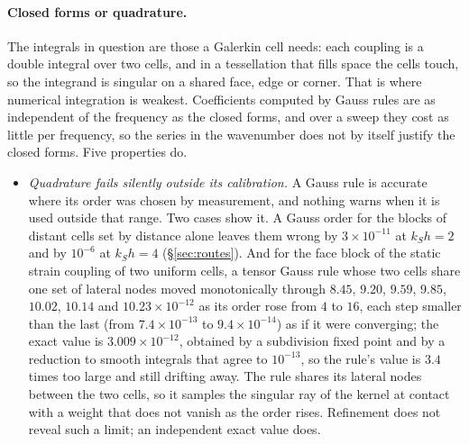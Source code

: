 \documentclass[11pt,a4paper]{article}
\begin{document}
\paragraph{Closed forms or quadrature.} The integrals in question are those a Galerkin cell needs: each coupling
is a double integral over two cells, and in a tessellation that fills space the cells touch, so the integrand
is singular on a shared face, edge or corner. That is where numerical integration is weakest. Coefficients
computed by Gauss rules are as independent of the frequency as the closed forms, and over a sweep they cost as
little per frequency, so the series in the wavenumber does not by itself justify the closed forms. Five
properties do.
\begin{itemize}
\item \emph{Quadrature fails silently outside its calibration.} A Gauss rule is accurate where its order was
chosen by measurement, and nothing warns when it is used outside that range. Two cases show it. A Gauss
order for the blocks of distant cells set by distance alone leaves them wrong by $3\times10^{-11}$ at
$k_Sh=2$ and by $10^{-6}$ at $k_Sh=4$ (\S\ref{sec:routes}). And for the face block of the static strain coupling of two uniform cells, a tensor
Gauss rule whose two cells share one set of lateral nodes moved monotonically through $8.45$, $9.20$,
$9.59$, $9.85$, $10.02$, $10.14$ and $10.23\times10^{-12}$ as its order rose from $4$ to $16$, each step smaller
than the last (from $7.4\times10^{-13}$ to $9.4\times10^{-14}$) as if it were converging; the exact value is
$3.009\times10^{-12}$, obtained by a subdivision fixed point and by a reduction to smooth integrals that agree
to $10^{-13}$, so the rule's value is $3.4$ times too large and still drifting away. The rule shares its
lateral nodes between the two cells, so it samples the singular ray of the kernel at contact with a weight
that does not vanish as the order rises. Refinement does not reveal such a limit; an independent exact value
does.


\end{itemize}
\end{document}
